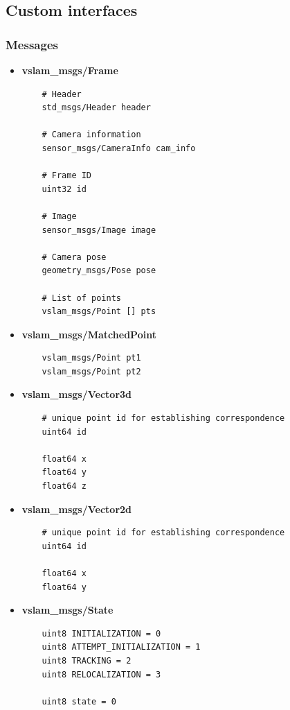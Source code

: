 \subsection{Custom interfaces}

\subsubsection{Messages}

\begin{itemize}
  \item \textbf{vslam\_msgs/Frame}
  \begin{verbatim}
    # Header
    std_msgs/Header header

    # Camera information
    sensor_msgs/CameraInfo cam_info

    # Frame ID
    uint32 id 

    # Image
    sensor_msgs/Image image
    
    # Camera pose
    geometry_msgs/Pose pose
    
    # List of points
    vslam_msgs/Point [] pts
  \end{verbatim}


  \item \textbf{vslam\_msgs/MatchedPoint}
  \begin{verbatim}
    vslam_msgs/Point pt1    
    vslam_msgs/Point pt2
  \end{verbatim}

  \item \textbf{vslam\_msgs/Vector3d}
  \begin{verbatim}
    # unique point id for establishing correspondence
    uint64 id

    float64 x
    float64 y  
    float64 z 
  \end{verbatim}

  \item \textbf{vslam\_msgs/Vector2d}
  \begin{verbatim}
    # unique point id for establishing correspondence
    uint64 id

    float64 x 
    float64 y 
  \end{verbatim}

  

  \item \textbf{vslam\_msgs/State}
  \begin{verbatim}
    uint8 INITIALIZATION = 0
    uint8 ATTEMPT_INITIALIZATION = 1
    uint8 TRACKING = 2
    uint8 RELOCALIZATION = 3
    
    uint8 state = 0
  \end{verbatim}
\end{itemize}

